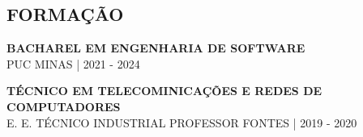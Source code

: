 \begin{framed}
    \section{FORMAÇÃO}

    \normalsize\textbf{BACHAREL EM ENGENHARIA DE SOFTWARE}\\
    \footnotesize{PUC MINAS | 2021 - 2024}

    \normalsize\textbf{TÉCNICO EM TELECOMINICAÇÕES E REDES DE COMPUTADORES}\\
    \footnotesize{E. E. TÉCNICO INDUSTRIAL PROFESSOR FONTES | 2019 - 2020}
  \end{framed}